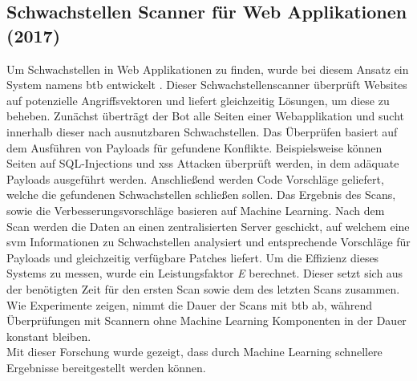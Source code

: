 \documentclass[
    12pt, %
    DIV10,
    ngerman, %
    a4paper, %
    oneside, %
    titlepage, %
    parskip=half, %
    headings=normal, %
    listof=totoc, %
    bibliography=totoc, %
    index=totoc, %
    captions=tableheading, %
    final %
]{scrreprt}
\begin{document}
\subsection{Schwachstellen Scanner für Web Applikationen (2017)}
Um Schwachstellen in Web Applikationen zu finden, wurde bei diesem Ansatz ein System namens \ac{btb} entwickelt \parencite{VidyavardhakaCollegeofEngineering2017}. Dieser Schwachstellenscanner überprüft Websites auf potenzielle Angriffsvektoren und liefert gleichzeitig Lösungen, um diese zu beheben. Zunächst überträgt der Bot alle Seiten einer Webapplikation und sucht innerhalb dieser nach ausnutzbaren Schwachstellen. Das Überprüfen basiert auf dem Ausführen von Payloads für gefundene Konflikte. Beispielsweise können Seiten auf SQL-Injections und \ac{xss} Attacken überprüft werden, in dem adäquate Payloads ausgeführt werden. Anschließend werden Code Vorschläge geliefert, welche die gefundenen Schwachstellen schließen sollen. Das Ergebnis des Scans, sowie die Verbesserungsvorschläge basieren auf Machine Learning. Nach dem Scan werden die Daten an einen zentralisierten Server geschickt, auf welchem eine \ac{svm} Informationen zu Schwachstellen analysiert und entsprechende Vorschläge für Payloads und gleichzeitig verfügbare Patches liefert. Um die Effizienz dieses Systems zu messen, wurde ein Leistungsfaktor \emph{E} berechnet. Dieser setzt sich aus der benötigten Zeit für den ersten Scan sowie dem des letzten Scans zusammen. Wie Experimente zeigen, nimmt die Dauer der Scans mit \ac{btb} ab, während Überprüfungen mit Scannern ohne Machine Learning Komponenten in der Dauer konstant bleiben.\\
Mit dieser Forschung wurde gezeigt, dass durch Machine Learning schnellere Ergebnisse bereitgestellt werden können.
%
\end{document}
